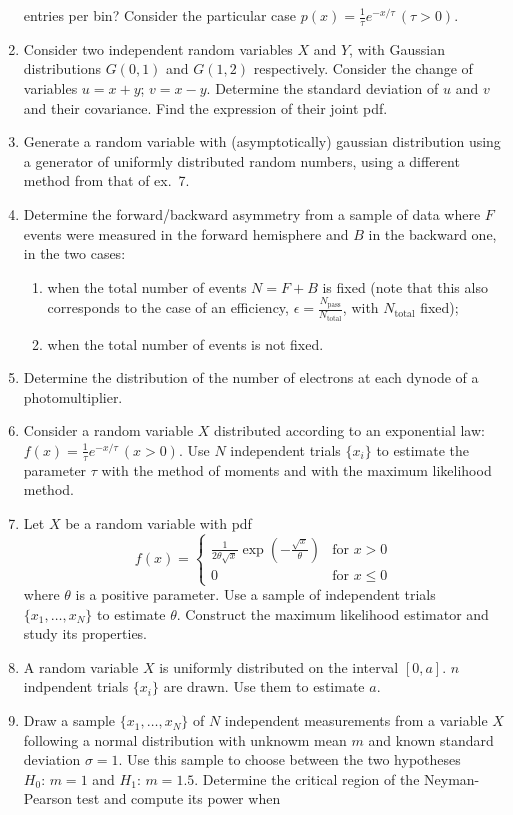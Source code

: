 \documentclass[a4paper,12pt]{article}
\begin{document}
\begin{enumerate}
  entries per bin? Consider the particular case $p(x) = \frac{1}{\tau}e^{-x/\tau}\,(\tau>0)$.
  \item Consider two independent random variables $X$ and $Y$, with Gaussian distributions $G(0,1)$ and $G(1,2)$ respectively. Consider the change of variables $u=x+y$; $v=x-y$.
  Determine the standard deviation of $u$ and $v$ and their covariance. Find the expression of their joint pdf.
  \item Generate a random variable with (asymptotically) gaussian distribution using a generator of uniformly distributed random numbers, using a different method from that of ex.~7.
  \item Determine the forward/backward asymmetry from a sample of data where $F$ events were measured in the forward hemisphere and $B$ in the backward one, in the two cases:
  \begin{enumerate}
   \item when the total number of events $N=F+B$ is fixed (note that this also corresponds to the case of an efficiency, $\epsilon = \frac{N_\text{pass}}{N_\text{total}}$, with $N_\text{total}$ fixed);
   \item when the total number of events is not fixed.
  \end{enumerate}
  \item Determine the distribution of the number of electrons at each dynode of a photomultiplier.
  \item Consider a random variable $X$ distributed according to an exponential law: $f(x) = \frac{1}{\tau} e^{-x/\tau}\,(x>0)$. Use $N$ independent trials $\{x_i\}$ to estimate the 
  parameter $\tau$ with the method of moments and with the maximum likelihood method.
  \item Let $X$ be a random variable with pdf 
  $$f(x) = \begin{cases} 
      \frac{1}{2\theta\sqrt{x}}\exp\left(-\frac{\sqrt{x}}{\theta}\right) & \text{for } x>0 \\ 
      0 & \text{for } x \leq 0
   \end{cases}$$
   where $\theta$ is a positive parameter. Use a sample of independent trials $\{x_1, \dots, x_N\}$ to estimate $\theta$. Construct the maximum likelihood estimator and study its properties.
   \item A random variable $X$ is uniformly distributed on the interval $[0,a]$. $n$ indpendent trials $\{x_i\}$ are drawn. Use them to estimate $a$.
   \item Draw a sample $\{x_1, \dots, x_N\}$ of $N$ independent measurements from a variable $X$ following a normal distribution with unknowm mean $m$ and known standard deviation $\sigma=1$. Use this sample to choose between the two hypotheses $H_0:\,m=1$ and $H_1:\,m=1.5$. Determine the critical region of the Neyman-Pearson test and compute its power when

\end{enumerate}
\end{document}
